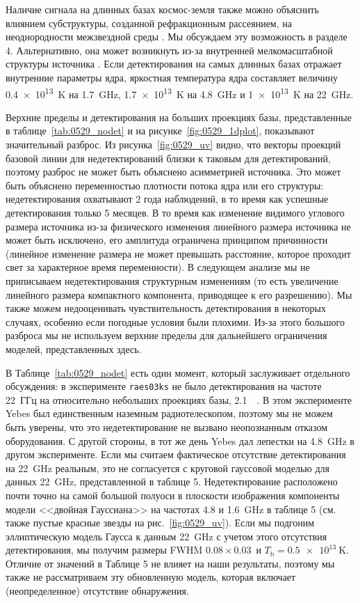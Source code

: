 Наличие сигнала на длинных базах космос-земля также можно объяснить влиянием субструктуры,
созданной рефракционным рассеянием, на неоднородности межзвездной среды \cite{Johnson_2015}. Мы
обсуждаем эту возможность в разделе 4. Альтернативно, она может возникнуть из-за внутренней
мелкомасштабной структуры источника \cite{Gomez_2016, Kovalev_2016}. Если детектирования на
самых длинных базах отражает внутренние параметры ядра, яркостная температура ядра составляет
величину \SI{0.4e13}{\kelvin} на \SI{1.7}{\GHz}, \SI{1.7e13}{\kelvin} на \SI{4.8}{\GHz} и
\SI{1e13}{\kelvin} на \SI{22}{\GHz}.

Верхние пределы и детектирования на больших проекциях базы, представленные в
таблице~\ref{tab:0529_nodet} и на рисунке~\ref{fig:0529_1dplot}, показывают значительный разброс. Из
рисунка~\ref{fig:0529_uv} видно, что векторы проекций базовой линии для недетектирований близки к
таковым для детектирований, поэтому разброс не может быть объяснено асимметрией источника. Это может
быть объяснено переменностью плотности потока ядра или его структуры: недетектирования охватывают 2
года наблюдений, в то время как успешные детектирования только 5 месяцев. В то время как изменение
видимого углового размера источника из-за физического изменения линейного размера источника не может
быть исключено, его амплитуда ограничена принципом причинности (линейное изменение размера не может
превышать расстояние, которое проходит свет за характерное время переменности). В следующем анализе
мы не приписываем недетектирования структурным изменениям (то есть увеличение линейного размера
компактного компонента, приводящее к его разрешению). Мы также можем недооценивать чувствительность
детектирования в некоторых случаях, особенно если погодные условия были плохими. Из-за этого
большого разброса мы не используем верхние пределы для дальнейшего ограничения моделей,
представленных здесь.

В Таблице~\ref{tab:0529_nodet} есть один момент, который заслуживает отдельного обсуждения: в
эксперименте \texttt{raes03ks} не было детектирования на частоте 22~ГГц на относительно небольших
проекциях базы, \SI{2.1}{\giga\la}. В этом эксперименте Yebes был единственным наземным
радиотелескопом, поэтому мы не можем быть уверены, что это недетектирование не вызвано неопознанным
отказом оборудования. С другой стороны, в тот же день Yebes дал лепестки на \SI{4.8}{\GHz} в другом
эксперименте. Если мы считаем фактическое отсутствие детектирования на \SI{22}{\GHz} реальным, это
не согласуется с круговой гауссовой моделью для данных \SI{22}{\GHz}, представленной в таблице 5.
Недетектирование расположено почти точно на самой большой полуоси в плоскости изображения компоненты
модели <<двойная Гауссиана>> на частотах 4.8 и \SI{1.6}{\GHz} в таблице 5 (см. также пустые красные
звезды на рис.~\ref{fig:0529_uv}). Если мы подгоним эллиптическую модель Гаусса к данным
\SI{22}{\GHz} с учетом этого отсутствия детектирования, мы получим размеры FWHM $0.08 \times
0.03$\,\si{\mas} и $T_\text{b} = \SI{0.5e13}{\kelvin}$. Отличие от значений в Таблице 5 не влияет на
наши результаты, поэтому мы также не рассматриваем эту обновленную модель, которая включает
(неопределенное) отсутствие обнаружения.

